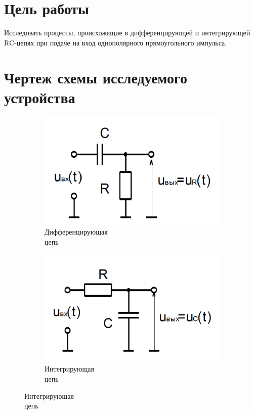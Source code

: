 





\section{Цель работы}
Исследовать процессы, происхожящие в дифференцирующей и интегрирующей RC-цепях при подаче на вход однополярного прямоугольного импульса.

\section{Чертеж схемы исследуемого устройства}
\begin{figure}[h]
\centering
\begin{subfigure}[b]{0.35\textwidth}
\includegraphics[scale=0.27]{diff.png}
\caption{Дифференцирующая\\ цепь}\label{figure:2.1:a}
\end{subfigure}
\begin{subfigure}[b]{0.35\textwidth}
\includegraphics[scale=0.27]{int.png}
\caption{Интегрирующая\\ цепь}\label{figure:2.1:b}
\end{subfigure}
\end{figure}

